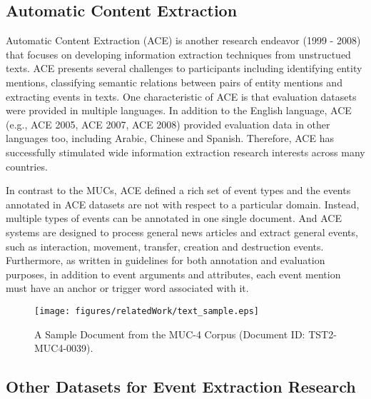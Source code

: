\subsection{Automatic Content Extraction}

Automatic Content Extraction (ACE) \cite{ace} is 
another research endeavor (1999 - 2008) that 
focuses on developing information extraction techniques 
from unstructued texts. 
ACE presents several challenges to participants including 
identifying entity mentions, classifying semantic relations 
between pairs of entity mentions and extracting events in texts. 
One characteristic of ACE is that 
evaluation datasets were provided in multiple languages. 
In addition to the English language, 
ACE (e.g., ACE 2005, ACE 2007, ACE 2008) provided evaluation data in other languages too, 
including Arabic, Chinese and Spanish. 
Therefore, ACE has successfully stimulated wide 
information extraction research interests across many countries. 

In contrast to the MUCs, 
ACE defined a rich set of event types and 
the events annotated in ACE datasets are 
not with respect to a particular domain. 
Instead, 
multiple 
types of events can be annotated in one single document. 
And ACE systems are designed to process general news articles and 
extract 
general events, 
such as interaction, movement, transfer, creation and destruction events. 
Furthermore, as written in guidelines for both annotation and 
evaluation purposes, in addition to event arguments 
and attributes, each event mention must have 
an anchor 
or trigger word associated with it.

  \begin{figure}[htbp]
 \centering
 \texttt{[image: figures/relatedWork/text\_sample.eps]}
 \caption{A Sample Document from the MUC-4 Corpus (Document ID: TST2-MUC4-0039).}
\label{related_text_sample}
\end{figure} 

\subsection{Other Datasets for Event Extraction Research}


